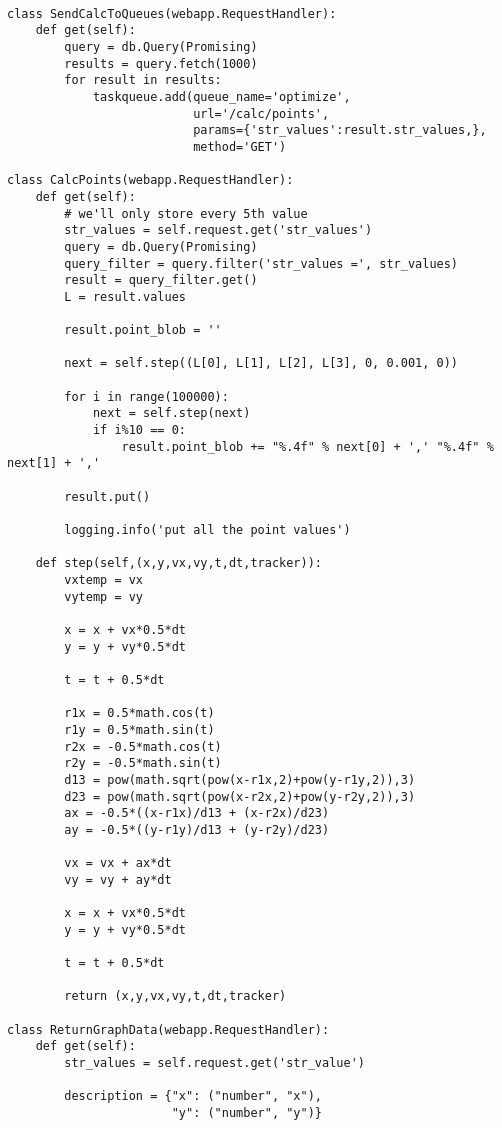 \documentclass[11pt]{article}
\begin{document}
\begin{verbatim}
    
class SendCalcToQueues(webapp.RequestHandler):
    def get(self):
        query = db.Query(Promising)
        results = query.fetch(1000)
        for result in results:
            taskqueue.add(queue_name='optimize',
                          url='/calc/points',
                          params={'str_values':result.str_values,},
                          method='GET')
    
class CalcPoints(webapp.RequestHandler):
    def get(self):
        # we'll only store every 5th value
        str_values = self.request.get('str_values')
        query = db.Query(Promising)
        query_filter = query.filter('str_values =', str_values)
        result = query_filter.get()
        L = result.values

        result.point_blob = ''
        
        next = self.step((L[0], L[1], L[2], L[3], 0, 0.001, 0))
        
        for i in range(100000):
            next = self.step(next)
            if i%10 == 0:
                result.point_blob += "%.4f" % next[0] + ',' "%.4f" % next[1] + ','

        result.put()

        logging.info('put all the point values')
        
    def step(self,(x,y,vx,vy,t,dt,tracker)):
        vxtemp = vx
        vytemp = vy

        x = x + vx*0.5*dt
        y = y + vy*0.5*dt

        t = t + 0.5*dt

        r1x = 0.5*math.cos(t)
        r1y = 0.5*math.sin(t)
        r2x = -0.5*math.cos(t)
        r2y = -0.5*math.sin(t)
        d13 = pow(math.sqrt(pow(x-r1x,2)+pow(y-r1y,2)),3)
        d23 = pow(math.sqrt(pow(x-r2x,2)+pow(y-r2y,2)),3)
        ax = -0.5*((x-r1x)/d13 + (x-r2x)/d23)
        ay = -0.5*((y-r1y)/d13 + (y-r2y)/d23)

        vx = vx + ax*dt
        vy = vy + ay*dt

        x = x + vx*0.5*dt
        y = y + vy*0.5*dt

        t = t + 0.5*dt

        return (x,y,vx,vy,t,dt,tracker)

class ReturnGraphData(webapp.RequestHandler):
    def get(self):
        str_values = self.request.get('str_value')
        
        description = {"x": ("number", "x"),
                       "y": ("number", "y")}


\end{verbatim}
\end{document}
